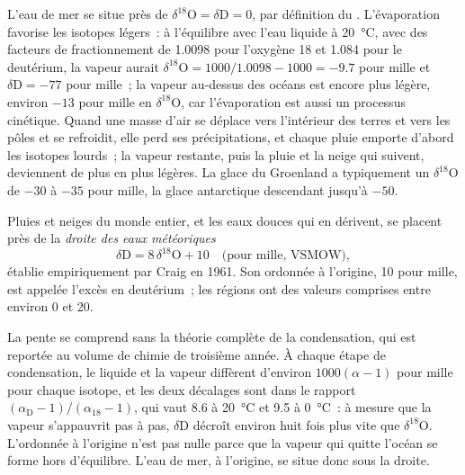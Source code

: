 L'eau de mer se situe près de $\delta^{18}\mathrm{O} = \delta\mathrm{D} = 0$, par
définition du . L'évaporation favorise les isotopes légers~: à l'équilibre
avec l'eau liquide à \qty{20}{\degreeCelsius}, avec des facteurs de fractionnement de
1.0098 pour l'oxygène 18 et 1.084 pour le deutérium, la vapeur aurait
$\delta^{18}\mathrm{O} = 1000/1.0098 - 1000 = -9.7$ pour mille et $\delta\mathrm{D} =
-77$ pour mille~; la vapeur au-dessus des océans est encore plus légère, environ $-13$ pour mille
en $\delta^{18}\mathrm{O}$, car l'évaporation est aussi un processus cinétique.
Quand une masse d'air se déplace vers l'intérieur des terres et vers les pôles et se refroidit, elle perd ses précipitations, et
chaque pluie emporte d'abord les isotopes lourds~; la vapeur restante, puis la pluie et la
neige qui suivent, deviennent de plus en plus légères. La glace du Groenland a typiquement
un $\delta^{18}\mathrm{O}$ de $-30$ à $-35$ pour mille, la glace antarctique descendant jusqu'à $-50$.

\begin{proposition}\label{prop:b2:isotope-geochemistry:mwl}
Pluies et neiges du monde entier, et les eaux douces qui en dérivent,
se placent près de la \emph{droite des eaux météoriques}
\[
  \delta\mathrm{D} = 8\,\delta^{18}\mathrm{O} + 10 \quad\text{(pour mille, VSMOW)},
\]
établie empiriquement par Craig en 1961. Son ordonnée à l'origine, 10 pour mille, est appelée
l'excès en deutérium~; les régions ont des valeurs comprises entre environ 0 et 20.
\end{proposition}
\admitted

\noindent La pente se comprend sans la théorie complète de la condensation,
qui est reportée au volume de chimie de troisième année. À chaque étape de condensation, le liquide
et la vapeur diffèrent d'environ $1000(\alpha - 1)$ pour mille pour chaque isotope, et
les deux décalages sont dans le rapport $(\alpha_{\mathrm D}-1)/(\alpha_{18}-1)$, qui
vaut 8.6 à \qty{20}{\degreeCelsius} et 9.5 à \qty{0}{\degreeCelsius}~: à mesure que la
vapeur s'appauvrit pas à pas, $\delta\mathrm{D}$ décroît environ huit fois plus vite que
$\delta^{18}\mathrm{O}$. L'ordonnée à l'origine n'est pas nulle parce que la vapeur qui quitte
l'océan se forme hors d'équilibre. L'eau de mer, à l'origine, se situe donc
sous la droite.

